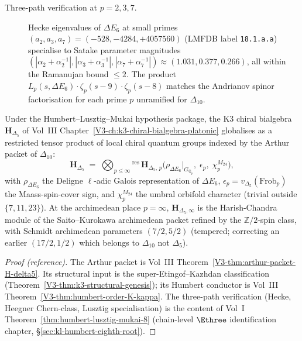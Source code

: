 \begin{description}
\item[Three-path verification at $p = 2, 3, 7$.]
Hecke eigenvalues of $\Delta E_6$ at small primes
$(a_2, a_3, a_7) = (-528, -4284, +4057560)$ (LMFDB label
\texttt{18.1.a.a}) specialise to Satake parameter magnitudes
$(|\alpha_2 + \alpha_2^{-1}|, |\alpha_3 + \alpha_3^{-1}|, |\alpha_7 +
\alpha_7^{-1}|) \approx (1.031, 0.377, 0.266)$, all within the
Ramanujan bound $\leq 2$. The product $L_p(s, \Delta E_6)
\cdot \zeta_p(s-9) \cdot \zeta_p(s-8)$ matches the Andrianov spinor
factorisation for each prime $p$ unramified for $\Delta_{10}$.
\end{description}

\begin{theorem}
\label{thm:pref-k3-arthur-parametrisation}
Under the Humbert--Lusztig--Mukai hypothesis package, the K3 chiral
bialgebra $\mathbf{H}_{\Delta_5}$ of Vol~III
Chapter~\ref{V3-ch:k3-chiral-bialgebra-platonic} globalises as a
restricted tensor product of local chiral quantum groups indexed by the
Arthur packet of $\Delta_{10}$:
\[
 \mathbf{H}_{\Delta_5}
 \;=\;
 \bigotimes_{p\leq\infty}{}^{\mathrm{res}}\,
 \mathbf{H}_{\Delta_5,\,p}\bigl(\rho_{\Delta E_6}|_{G_{\mathbb{Q}_p}},\;
 \epsilon_p,\; \chi^{M_{24}}_p\bigr),
\]
with $\rho_{\Delta E_6}$ the Deligne $\ell$-adic Galois representation
of $\Delta E_6$, $\epsilon_p = v_{\Delta_5}(\mathrm{Frob}_p)$ the
Maass-spin-cover sign, and $\chi^{M_{24}}_p$ the umbral orbifold
character (trivial outside $\{7, 11, 23\}$). At the archimedean place
$p = \infty$, $\mathbf{H}_{\Delta_5, \infty}$ is the Harish-Chandra
module of the Saito--Kurokawa archimedean packet refined by the
$\mathbb{Z}/2$-spin class, with Schmidt archimedean parameters
$(7/2, 5/2)$ (tempered; correcting an earlier $(17/2, 1/2)$ which
belongs to $\Delta_{10}$ not $\Delta_5$).
\end{theorem}

\begin{proof}[Proof (reference)]
The Arthur packet is Vol~III
Theorem~\ref{V3-thm:arthur-packet-H-delta5}. Its structural input is the
super-Etingof--Kazhdan classification
(Theorem~\ref{V3-thm:k3-structural-genesis}); its Humbert conductor is
Vol~III Theorem~\ref{V3-thm:humbert-order-K-kappa}. The three-path
verification (Hecke, Heegner Chern-class, Lusztig specialisation) is the
content of Vol~I
Theorem~\ref{thm:humbert-lusztig-mukai-8} (chain-level $\Ethree$
identification chapter,
\S\ref{sec:kl-humbert-eighth-root}).
\end{proof}


